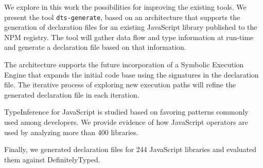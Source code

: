 We explore in this work the possibilities for improving the existing tools. We present the tool \texttt{dts-generate}, based on an architecture that supports the generation of declaration files for an existing JavaScript library published to the NPM registry. The tool will gather data flow and type information at run-time and generate a declaration file based on that information.

The architecture supports the future incorporation of a Symbolic Execution Engine that expands the initial code base using the signatures in the declaration file. The iterative process of exploring new execution paths will refine the generated declaration file in each iteration.

TypeInference for JavaScript is studied based on favoring patterns commonly used among developers. We provide evidence of how JavaScript operators are used by analyzing more than 400 libraries.

Finally, we generated declaration files for 244 JavaScript libraries and evaluated them against DefinitelyTyped.

